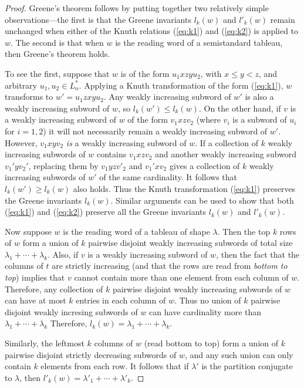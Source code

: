 \documentclass[11pt]{amsart}
\theoremstyle{definition}
\theoremstyle{example}
\begin{document}
\begin{proof}
  Greene's theorem follows by putting together two relatively simple observations---the first is that the Greene invariants $l_k(w)$ and $l'_k(w)$ remain unchanged when either of the Knuth relations (\ref{eq:k1}) and (\ref{eq:k2}) is applied to $w$.
  The second is that when $w$ is the reading word of a semistandard tableau, then Greene's theorem holds.

  To see the first, suppose that $w$ is of the form $u_1xzyu_2$, with $x\leq y < z$, and arbitrary $u_1,u_2\in L_n^*$.
  Applying a Knuth transformation of the form (\ref{eq:k1}), $w$ transforms to $w'=u_1zxyu_2$.
  Any weakly increasing subword of $w'$ is also a weakly increasing subword of $w$, so $l_k(w')\leq l_k(w)$.
  On the other hand, if $v$ is a weakly increasing subword of $w$ of the form $v_1xzv_2$ (where $v_i$ is a subword of $u_i$ for $i=1,2$) it will not necessarily remain a weakly increasing subword of $w'$.
  However, $v_1xyv_2$ \emph{is} a weakly increasing subword of $w$.
  If a collection of $k$ weakly increasing subwords of $w$ contains $v_1xzv_2$ and another weakly increasing subword $v_1'yv_2'$, replacing them by $v_1yzv'_2$ and  $v_1'xv_2$ gives a collection of $k$ weakly increasing subwords of $w'$ of the same cardinality.
  It follows that $l_k(w')\geq l_k(w)$ also holds.
  Thus the Knuth transformation (\ref{eq:k1}) preserves the Greene invariants $l_k(w)$.
  Similar arguments can be used to show that both (\ref{eq:k1}) and (\ref{eq:k2}) preserve all the Greene invariants $l_k(w)$ and $l'_k(w)$.

  Now suppose $w$ is the reading word of a tableau of shape $\lambda$.
  Then the top $k$ rows of $w$ form a union of $k$ pairwise disjoint weakly increasing subwords of total size $\lambda_1+\dotsb+\lambda_k$.
  Also, if $v$ is a weakly increasing subword of $w$, then the fact that the columns of $t$ are strictly increasing (and that the rows are read from \emph{bottom to top}) implies that $v$ cannot contain more than one element from each column of $w$.
  Therefore, any collection of $k$ pairwise disjoint weakly increasing subwords of $w$ can have at most $k$ entries in each column of $w$.
  Thus no union of $k$ pairwise disjoint weakly incresing subwords of $w$ can have cardinality more than $\lambda_1+\dotsb+\lambda_k$
  Therefore, $l_k(w)=\lambda_1+\dotsb+\lambda_k$.

  Similarly, the leftmost $k$ columns of $w$ (read bottom to top) form a union of $k$ pairwise disjoint strictly decreasing subwords of $w$, and any such union can only contain $k$ elements from each row.
  It follows that if $\lambda'$ is the partition conjugate to $\lambda$, then $l'_k(w)=\lambda'_1+\dotsb + \lambda'_k$.
\end{proof}
\end{document}
